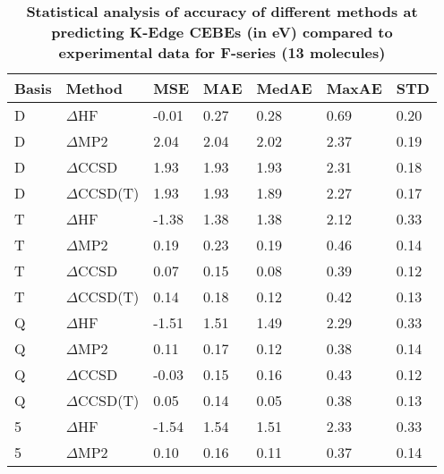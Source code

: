 \begin{table}
  \caption{\textbf{Statistical analysis of accuracy of different methods at predicting K-Edge CEBEs (in eV) compared to experimental data for F-series (13 molecules)}}
  \label{tbl:method-summary-f}
  \begin{tabular}{l l l l l l l }
    \toprule
    \textbf{Basis} & \textbf{Method} & \textbf{MSE} & \textbf{MAE} & \textbf{MedAE} & \textbf{MaxAE} & \textbf{STD} \\ 
    \midrule
    D & $\Delta$HF & -0.01 & 0.27 & 0.28 & 0.69 & 0.20 \\ 
    D & $\Delta$MP2 & 2.04 & 2.04 & 2.02 & 2.37 & 0.19 \\ 
    D & $\Delta$CCSD & 1.93 & 1.93 & 1.93 & 2.31 & 0.18 \\ 
    D & $\Delta$CCSD(T) & 1.93 & 1.93 & 1.89 & 2.27 & 0.17 \\ 
    T & $\Delta$HF & -1.38 & 1.38 & 1.38 & 2.12 & 0.33 \\ 
    T & $\Delta$MP2 & 0.19 & 0.23 & 0.19 & 0.46 & 0.14 \\ 
    T & $\Delta$CCSD & 0.07 & 0.15 & 0.08 & 0.39 & 0.12 \\ 
    T & $\Delta$CCSD(T) & 0.14 & 0.18 & 0.12 & 0.42 & 0.13 \\ 
    Q & $\Delta$HF & -1.51 & 1.51 & 1.49 & 2.29 & 0.33 \\ 
    Q & $\Delta$MP2 & 0.11 & 0.17 & 0.12 & 0.38 & 0.14 \\ 
    Q & $\Delta$CCSD & -0.03 & 0.15 & 0.16 & 0.43 & 0.12 \\ 
    Q & $\Delta$CCSD(T) & 0.05 & 0.14 & 0.05 & 0.38 & 0.13 \\ 
    5 & $\Delta$HF & -1.54 & 1.54 & 1.51 & 2.33 & 0.33 \\ 
    5 & $\Delta$MP2 & 0.10 & 0.16 & 0.11 & 0.37 & 0.14 \\ 
    \bottomrule
  \end{tabular}
\end{table}
